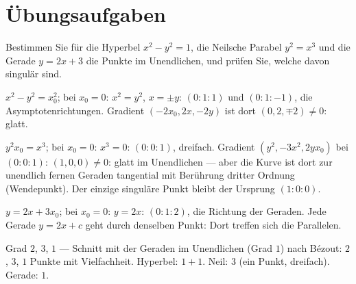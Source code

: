 \section{Übungsaufgaben}

\begin{aufgabe}
Bestimmen Sie für die Hyperbel $x^{2} - y^{2} = 1$, die Neilsche Parabel $y^{2} = x^{3}$ und die Gerade $y = 2x + 3$ die Punkte im Unendlichen, und prüfen Sie, welche davon singulär sind.

\loesung
{}
$x^{2} - y^{2} = x_0^{2}$; bei $x_0 = 0$: $x^{2} = y^{2}$, $x = \pm y$: $(0 : 1 : 1)$ und $(0 : 1 : -1)$, die Asymptotenrichtungen. Gradient $(-2x_0, 2x, -2y)$ ist dort $(0, 2, \mp2)\ne0$: glatt.

$y^{2}x_0 = x^{3}$; bei $x_0 = 0$: $x^{3} = 0$: $(0 : 0 : 1)$, dreifach. Gradient $(y^{2}, -3x^{2}, 2yx_0)$ bei $(0 : 0 : 1)$: $(1, 0, 0)\ne0$: glatt im Unendlichen --- aber die Kurve ist dort zur unendlich fernen Geraden tangential mit Berührung dritter Ordnung (Wendepunkt). Der einzige singuläre Punkt bleibt der Ursprung $(1 : 0 : 0)$.

$y = 2x + 3x_0$; bei $x_0 = 0$: $y = 2x$: $(0 : 1 : 2)$, die Richtung der Geraden. Jede Gerade $y = 2x + c$ geht durch denselben Punkt: Dort treffen sich die Parallelen.

Grad $2$, $3$, $1$ --- Schnitt mit der Geraden im Unendlichen (Grad $1$) nach Bézout: $2$, $3$, $1$ Punkte mit Vielfachheit. Hyperbel: $1 + 1$. Neil: $3$ (ein Punkt, dreifach). Gerade: $1$. \checkmark

\begin{center}
\begin{minipage}{0.88\textwidth}
\end{minipage}
\end{center}
\end{aufgabe}

